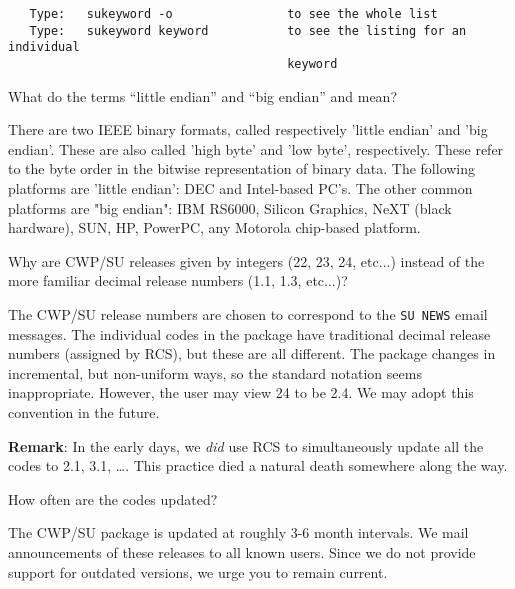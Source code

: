 {{{{{{{\begin{rmans}
\begin{verbatim}
   Type:   sukeyword -o                to see the whole list 
   Type:   sukeyword keyword           to see the listing for an individual
                                       keyword
\end{verbatim}
\end{rmans}

\begin{question}
What do the terms ``little endian'' and ``big endian'' and  mean?
\end{question}

\begin{rmans}
There are two IEEE binary formats, called respectively
'little endian' and 'big endian'. These are also called
'high byte' and 'low byte', respectively.
These refer to the byte order in the bitwise representation of
binary data. The following platforms are 'little endian': DEC and
Intel-based PC's. The other common platforms are "big endian":
IBM RS6000, Silicon Graphics, NeXT (black hardware), SUN,
HP, PowerPC, any Motorola chip-based platform.
\end{rmans}

\begin{question}
Why are {\sf CWP/SU} releases given by integers (22, 23, 24, etc...)
instead of the more familiar decimal release numbers (1.1, 1.3, etc...)?
\end{question}

\begin{rmans}
The {\sf CWP/SU} release numbers are chosen to correspond
to the {\tt SU NEWS} email messages.
The individual codes in the package have traditional decimal
release numbers (assigned by {\sf RCS}), but these are all different.
The package changes in incremental, but non-uniform ways, so the standard
notation seems inappropriate. However, the user may view 24 to be
2.4. We may adopt this convention in the future.

{\bf Remark}:  In the early days, we {\em did} use {\sf RCS} to
simultaneously update all the codes to 2.1, 3.1, \ldots .  This
practice died a natural death somewhere along the way.
\end{rmans}

\begin{question}
How often are the codes updated?
\end{question}

\begin{rmans}
The {\sf CWP/SU\/} package is updated at roughly 3-6 month intervals.
We mail announcements of these releases to all known users.  Since
we do not provide support for outdated versions, we urge you to remain current.
\end{rmans}

}}}}}}}
